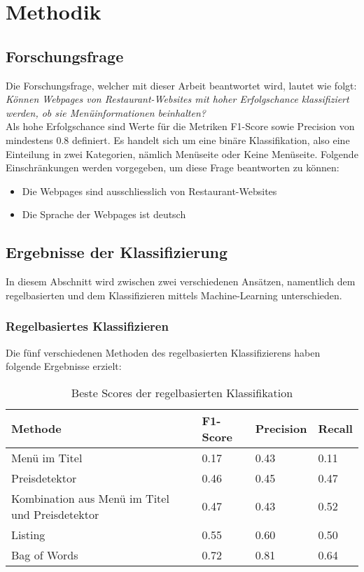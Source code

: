 \chapter{Methodik}
\section{Forschungsfrage}
Die Forschungsfrage, welcher mit dieser Arbeit beantwortet wird, lautet wie folgt:\\

\emph{Können Webpages von Restaurant-Websites mit hoher Erfolgschance klassifiziert werden, ob sie Menüinformationen beinhalten?}\\

Als hohe Erfolgschance sind Werte für die Metriken \glqq F1-Score\grqq{} sowie \glqq Precision\grqq{} von mindestens 0.8 definiert.
Es handelt sich um eine binäre Klassifikation, also eine Einteilung in zwei Kategorien, nämlich \glqq Menüseite\grqq{} oder \glqq Keine Menüseite\grqq.
Folgende Einschränkungen werden vorgegeben, um diese Frage beantworten zu können:
\begin{itemize}
	\item Die Webpages sind ausschliesslich von Restaurant-Websites
	\item Die Sprache der Webpages ist deutsch
\end{itemize}
\section{Ergebnisse der Klassifizierung}
In diesem Abschnitt wird zwischen zwei verschiedenen Ansätzen, namentlich dem regelbasierten und dem Klassifizieren mittels Machine-Learning unterschieden.
\subsection{Regelbasiertes Klassifizieren}
Die fünf verschiedenen Methoden des regelbasierten Klassifizierens haben folgende Ergebnisse erzielt:\\
\begin{table}[H]
\caption{Beste Scores der regelbasierten Klassifikation}
\centering
\begin{tabular}{|l|l|l|l|}
	\hline
	Methode & F1-Score & Precision & Recall\\
	\hline
	Menü im Titel & 0.17 & 0.43 & 0.11 \\
	Preisdetektor & 0.46 & 0.45 & 0.47 \\
	Kombination aus Menü im Titel und Preisdetektor & 0.47 & 0.43 & 0.52\\
	Listing & 0.55 & 0.60 & 0.50\\
	Bag of Words & 0.72 & 0.81 & 0.64\\
	\hline
\end{tabular}
\end{table}

